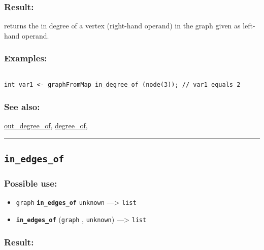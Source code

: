 \documentclass[]{book}
\providecommand{\tightlist}{%
  \setlength{\itemsep}{0pt}\setlength{\parskip}{0pt}}
\theoremstyle{definition}
\theoremstyle{definition}
\theoremstyle{definition}
\theoremstyle{remark}
\begin{document}
\subsubsection{Result:}\label{result-257}

returns the in degree of a vertex (right-hand operand) in the graph
given as left-hand operand.

\subsubsection{Examples:}\label{examples-205}

\begin{verbatim}
 
int var1 <- graphFromMap in_degree_of (node(3)); // var1 equals 2
\end{verbatim}

\subsubsection{See also:}\label{see-also-115}

\href{operators-n-to-r.html\#out_degree_of}{out\_degree\_of},
\href{operators-d-to-h.html\#degree_of}{degree\_of},

\begin{center}\rule{0.5\linewidth}{\linethickness}\end{center}

\subsection{\texorpdfstring{\texttt{in\_edges\_of}}{in\_edges\_of}}\label{in_edges_of}

\subsubsection{Possible use:}\label{possible-use-268}

\begin{itemize}
\tightlist
\item
  \texttt{graph} \textbf{\texttt{in\_edges\_of}} \texttt{unknown}
  ---\textgreater{} \texttt{list}
\item
  \textbf{\texttt{in\_edges\_of}} (\texttt{graph} , \texttt{unknown})
  ---\textgreater{} \texttt{list}
\end{itemize}

\subsubsection{Result:}\label{result-258}
\end{document}
